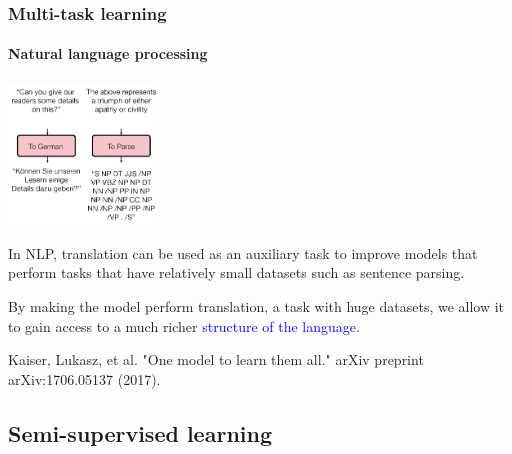 \documentclass[10pt]{beamer}
\begin{document}
\begin{frame}
  \frametitle{Multi-task learning}

  \framesubtitle{Natural language processing}

  \begin{center}
    \includegraphics[width = 4cm]{images/multi_task_nlp.png}
  \end{center}

  In NLP, translation can be used as an auxiliary task to improve
  models that perform tasks that have relatively small datasets such
  as sentence parsing.

  \bigskip

  By making the model perform translation, a task with huge datasets,
  we allow it to gain access to a much richer
  \textcolor{blue}{structure of the language}.

  \bigskip

  {\scriptsize Kaiser, Lukasz, et al. "One model to learn them all."
    arXiv preprint arXiv:1706.05137 (2017).}

\end{frame}

\subsection{Semi-supervised learning}
\end{document}
